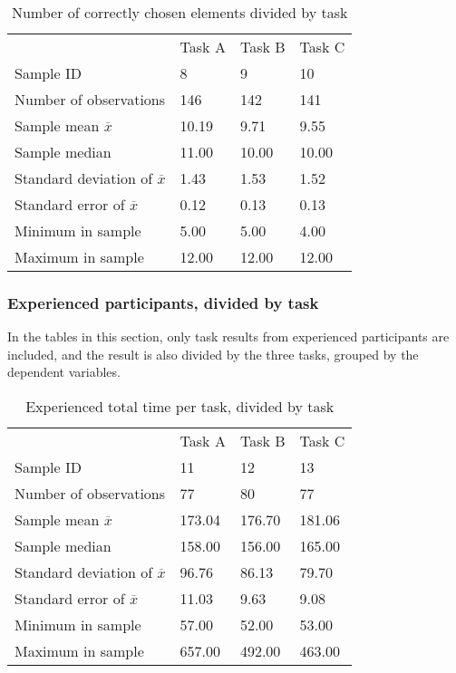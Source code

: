\begin{table}[H]
	\centering
	\begin{tabular}{l|l|l|l}
		& Task A & Task B & Task C\\ 
		Sample ID & 8  & 9  & 10   \\ \hline
		Number of observations & 146    & 142     & 141        \\
		Sample mean $\overline{x}$ & 10.19  &  9.71  &   9.55   \\
		Sample median & 11.00 &  10.00  &  10.00   \\
		Standard deviation of $\overline{x}$ & 1.43  & 1.53 & 1.52    \\
		Standard error of $\overline{x}$ & 0.12 &  0.13 & 0.13  \\
		Minimum in sample  & 5.00  & 5.00  &   4.00  \\
		Maximum in sample  & 12.00 & 12.00  & 12.00 \\ \hline
	\end{tabular}
	\caption[Correct elements, divided by task]{Number of correctly chosen elements divided by task}
	\label{tab:totalcorrect_tasks}
\end{table}

\subsubsection{Experienced participants, divided by task}\label{sec:taskdivided_experienced}

In the tables in this section, only task results from experienced participants are included, and the result is also divided by the three tasks, grouped by the dependent variables.

\begin{table}[H]
	\centering
	\begin{tabular}{l|l|l|l}
		 & Task A & Task B & Task C \\ 
		Sample ID & 11  & 12  & 13   \\ \hline
		Number of observations & 77  & 80   & 77  \\
		Sample mean $\overline{x}$  & 173.04  &  176.70  &  181.06   \\
		Sample median  & 158.00  &  156.00  &  165.00  \\
		Standard deviation of $\overline{x}$ & 96.76  & 86.13  & 79.70   \\
		Standard error of $\overline{x}$ & 11.03 & 9.63 & 9.08  \\
		Minimum in sample   & 57.00  & 52.00 &  53.00  \\
		Maximum in sample  & 657.00 & 492.00  & 463.00 \\ \hline
	\end{tabular}
	\caption[Total time, divided by task, only experienced]{Experienced total time per task, divided by task}
	\label{tab:totaltime_tasks_experienced}
\end{table}

